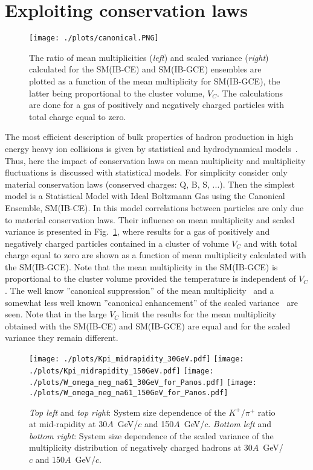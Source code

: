 \documentclass{PoS}
\begin{document}
\clearpage

\section{Exploiting conservation laws}
\label{sec:conservation}

\begin{figure}[h]
	\centering
	\texttt{[image: ./plots/canonical.PNG]}
	\caption[]
	{
		The ratio of  mean multiplicities  
		(\textit{left}) and scaled variance (\textit{right})
		calculated for the SM(IB-CE) and SM(IB-GCE) ensembles are 
		plotted as a function of the mean multiplicity for SM(IB-GCE), the latter 
		being proportional to the cluster volume, $V_C$.
		The calculations are done for a gas of positively and negatively
		charged particles with total charge equal to zero.
	}
	\label{fig:canonical}
\end{figure}


The most efficient description of bulk properties of hadron production in high energy heavy ion collisions
is given by statistical and hydrodynamical models~\cite{florkowski}.
Thus, here the impact of conservation laws on mean multiplicity and multiplicity fluctuations is
discussed with statistical models.
For simplicity consider only material  conservation laws (conserved charges: Q, B, S, ...).
Then the simplest model is a Statistical Model with Ideal Boltzmann Gas using the Canonical Ensemble, SM(IB-CE).
In this model correlations between particles are only due to material conservation laws.
Their influence on mean multiplicity and scaled variance is presented in Fig.~\ref{fig:canonical}, where
results for a gas of positively and negatively charged particles contained in a cluster of volume $V_C$ and
with total charge equal to zero are shown as
a function of mean multiplicity calculated with the  SM(IB-GCE). Note that the mean multiplicity in the SM(IB-GCE) is proportional
to the cluster volume provided the temperature is independent of $V_C$.
The well know ''canonical suppression'' of the mean multiplicity~\cite{danos} and
a somewhat less well known ''canonical enhancement'' of the scaled variance~\cite{begun} are seen. 
Note that in the large $V_C$ limit the results for the mean multiplicity obtained with the SM(IB-CE) and SM(IB-GCE) are
equal and for the scaled variance they remain different.  
  
\begin{figure}[h]
	\centering
	\texttt{[image: ./plots/Kpi\_midrapidity\_30GeV.pdf]}
	\texttt{[image: ./plots/Kpi\_midrapidity\_150GeV.pdf]}
	\centering
	\hspace*{0.9cm}\texttt{[image: ./plots/W\_omega\_neg\_na61\_30GeV\_for\_Panos.pdf]}
	\texttt{[image: ./plots/W\_omega\_neg\_na61\_150GeV\_for\_Panos.pdf]}
	\caption[]{
		\textit{Top left} and \textit{top right}: 
		System size dependence of the $K^{+}/\pi^{+}$ ratio at mid-rapidity at 30$A$~GeV/$c$ and 150$A$~GeV/$c$. 
		\textit{Bottom left} and \textit{bottom right}: 
		System size dependence of the scaled variance of the multiplicity distribution of negatively 
		charged hadrons at 30$A$~GeV/$c$ and 150$A$~GeV/$c$.}
	\label{fig:OoF}
\end{figure}
\end{document}
